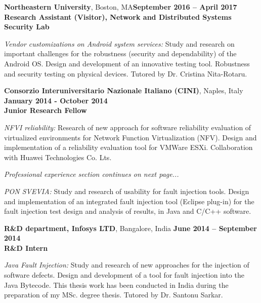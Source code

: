 \documentclass[margin,line]{resume}
\begin{document}
\begin{resume}
\textbf{Northeastern University}, Boston, MA\hfill\textbf{September 2016 -- April 2017}\\
\textbf{Research Assistant (Visitor), Network and Distributed Systems Security Lab}\hfill 
\vspace{-3mm}\\\vspace{-1mm}
\begin{list2}
	\item \filbreak\textit{Vendor customizations on Android system services:} Study and research on important challenges for the robustness (security and dependability) of the Android OS. Design and development of an innovative testing tool. Robustness and security testing on physical devices. Tutored by Dr. Cristina Nita-Rotaru.
\end{list2}

\textbf{Consorzio Interuniversitario Nazionale Italiano (CINI)}, Naples, Italy\\
\null\hfill\textbf{January 2014 - October 2014}\\
\textbf{Junior Research Fellow}\hfill 
\vspace{-3mm}\\\vspace{-1mm}
\begin{list2}
	\item \filbreak\textit{NFVI reliability:} Research of new approach for software reliability evaluation of virtualized environments for Network Function Virtualization (NFV). Design and implementation of a reliability evaluation tool for VMWare ESXi. Collaboration with Huawei Technologies Co. Lts.
	\item[] \item[] \hfill \textit{Professional experience section continues on next page...}
	\item \filbreak\textit{PON SVEVIA:} Study and research of usability for fault injection tools. Design and implementation of an integrated fault injection tool (Eclipse plug-in) for the fault injection test design and analysis of results, in Java and C/C++ software.
\end{list2}

\filbreak
\textbf{R\&D department, Infosys LTD}, Bangalore, India\hfill
\textbf{June 2014 -- September 2014}\\
\textbf{R\&D Intern}\hfill 
\vspace{-3mm}\\\vspace{-1mm}
\begin{list2}
    \item \filbreak\textit{Java Fault Injection:} Study and research of new approaches for the injection of software defects. Design and development of a tool for fault injection into the Java Bytecode. This thesis work has been conducted in India during the preparation of my MSc. degree thesis. Tutored by Dr. Santonu Sarkar.
\end{list2}


\end{resume}
\end{document}
